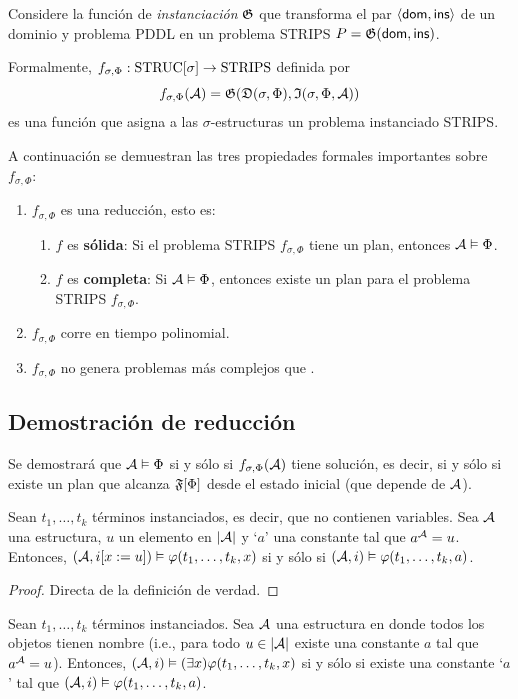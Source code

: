 Considere la función de \emph{instanciación} $\mathfrak{G}$ que transforma el par
$\langle \mathsf{dom},\mathsf{ins} \rangle$ de un dominio y problema PDDL en un problema STRIPS
$P = \mathfrak{G}(\mathsf{dom}, \mathsf{ins})$.

Formalmente, $f_{\sigma,\Phi}:\text{STRUC}[\sigma]\rightarrow\text{STRIPS}$
definida por 
\[ f_{\sigma,\Phi}(\mathcal{A}) = \mathfrak{G}(\mathfrak{D}(\sigma,\Phi),\mathfrak{I}(\sigma,\Phi,\mathcal{A})) \]
es una función que asigna a las $\sigma$-estructuras un
problema instanciado STRIPS.

A continuación se demuestran las tres propiedades formales importantes sobre
$f_{\sigma,\Phi}$:
\begin{enumerate}
\item $f_{\sigma,\Phi}$ es una reducción, esto es:
    \begin{enumerate}
        \item $f$ es \textbf{sólida}: Si el problema STRIPS $f_{\sigma,\Phi}$ tiene un plan,
            entonces $\mathcal{A} \vDash \Phi$.
        \item $f$ es \textbf{completa}: Si $\mathcal{A}\vDash\Phi$, entonces existe un plan para el 
            problema STRIPS $f_{\sigma,\Phi}$.
    \end{enumerate}
\item $f_{\sigma,\Phi}$ corre en tiempo polinomial.
\item $f_{\sigma,\Phi}$ no genera problemas más complejos que \SOE.
\end{enumerate}

\subsection{Demostración de reducción}
Se demostrará que $\mathcal{A} \vDash \Phi$ si y sólo si $f_{\sigma,\Phi}(\mathcal{A})$ tiene
solución, es decir, si y sólo si existe un plan que alcanza $\mathfrak{F}[\Phi]$ desde
el estado inicial (que depende de $\mathcal{A}$).

\begin{proposition}
\label{t1}
Sean $t_1,\ldots,t_k$ términos instanciados, es decir, que no contienen
variables. Sea $\mathcal{A}$ una estructura, $u$ un elemento en $|\mathcal{A}|$ y `$a$' una constante tal que
$a^{\mathcal{A}}=u$.
Entonces, $(\mathcal{A}, i[x:=u]) \vDash \varphi(t_1,\ldots,t_k,x)$ si y sólo si
$(\mathcal{A}, i) \vDash \varphi(t_1,\ldots,t_k,a)$.
\end{proposition}
\begin{proof}
Directa de la definición de verdad.
\end{proof}
\begin{corollary}
\label{corolario}
Sean $t_1,\ldots,t_k$ términos instanciados. Sea $\mathcal{A}$ una
estructura en donde todos los objetos tienen nombre (i.e., para todo $u\in|\mathcal{A}|$
existe una constante $a$ tal que $a^{\mathcal{A}}=u$). Entonces,
$(\mathcal{A}, i) \vDash (\exists x) \varphi(t_1,\ldots,t_k,x)$ si y sólo si
existe una constante `$a$' tal que $(\mathcal{A}, i) \vDash \varphi(t_1,\ldots,t_k,a)$.
\end{corollary}


